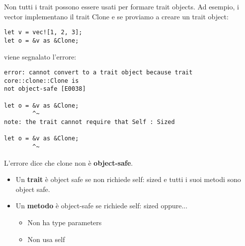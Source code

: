 Non tutti i trait possono essere usati per formare trait objects.
Ad esempio, i vector implementano il trait Clone e se proviamo a creare un trait
object:

\begin{lstlisting}
let v = vec![1, 2, 3];
let o = &v as &Clone;
\end{lstlisting}

viene segnalato l'errore:

\begin{lstlisting}
error: cannot convert to a trait object because trait core::clone::Clone is
not object-safe [E0038]

let o = &v as &Clone;
        ^~
note: the trait cannot require that Self : Sized

let o = &v as &Clone;
        ^~
\end{lstlisting}

L'errore dice che clone non è \textbf{object-safe}.

\begin{itemize}
  \item Un \textbf{trait} è object safe se non richiede self: sized e tutti i suoi
metodi sono object safe.

  \item Un \textbf{metodo} è object-safe se richiede self: sized oppure...
\begin{itemize}
  \item Non ha type parameters
  \item Non usa self
\end{itemize}
\end{itemize}
